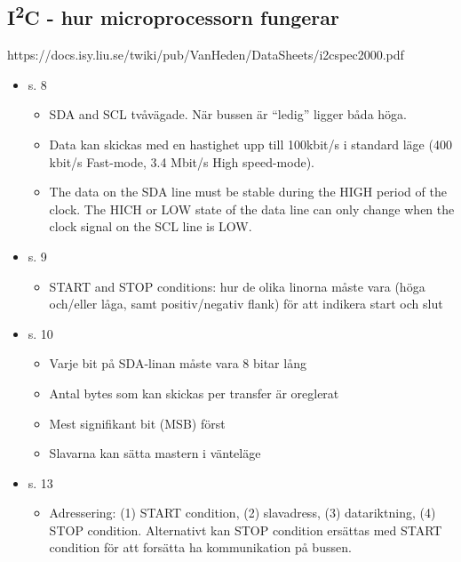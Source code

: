 \documentclass[11pt]{article}
\begin{document}
\begin{flushleft}
\subsection{I\textsuperscript{2}C - hur microprocessorn fungerar}
https://docs.isy.liu.se/twiki/pub/VanHeden/DataSheets/i2cspec2000.pdf
	\begin{itemize}
		\item s. 8
		\begin{itemize}
			\item SDA and SCL tvåvägade. När bussen är \textquotedblleft ledig\textquotedblright{} ligger båda höga. 
			\item Data kan skickas med en hastighet upp till 100kbit/s i standard läge (400 kbit/s Fast-mode, 3.4 Mbit/s High speed-mode).
			\item The data on the SDA line must be stable during the HIGH period of the clock. The HICH or LOW state of the data line can only change when the clock signal on the SCL line is LOW.
		\end{itemize}
			
		\item s. 9
		\begin{itemize}
			\item START and STOP conditions: hur de olika linorna måste vara (höga och/eller låga, samt positiv/negativ flank) för att indikera start och slut
		\end{itemize}
		
		\item s. 10
		\begin{itemize}
			\item Varje bit på SDA-linan måste vara 8 bitar lång
			\item Antal bytes som kan skickas per transfer är oreglerat
			\item Mest signifikant bit (MSB) först
			\item Slavarna kan sätta mastern i vänteläge
		\end{itemize}
		
		\item s. 13
		\begin{itemize}
			\item Adressering: (1) START condition, (2) slavadress, (3) datariktning, (4) STOP condition. Alternativt kan STOP condition ersättas med START condition för att forsätta ha kommunikation på bussen.
		\end{itemize}
\end{itemize}	




\end{flushleft}
\end{document}
